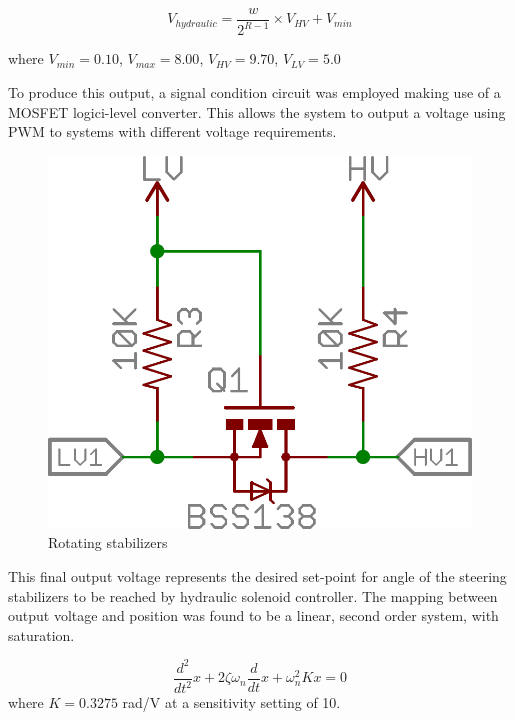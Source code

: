 \documentclass[authoryear]{elsarticle}
\begin{document}
\begin{equation}
  V_{hydraulic} = \frac{w}{2^{R-1}} \times V_{HV} + V_{min}
  \label{eq:v_out}
\end{equation}
\begin{flushleft}
where $V_{min}=0.10$, $V_{max}=8.00$, $V_{HV}=9.70$, $V_{LV}=5.0$
\end{flushleft}

To produce this output, a signal condition circuit was employed making
use of a MOSFET logici-level converter. This allows the system to
output a voltage using PWM to systems with different voltage
requirements.

\begin{figure}
  \centering
  \includegraphics[scale=0.3,natwidth=610,natheight=642]{signal_conditioning.png}
  \caption{Rotating stabilizers}
  \label{fig:signal_conditioning}
\end{figure}

This final output voltage represents the desired set-point for angle
of the steering stabilizers to be reached by hydraulic solenoid
controller. The mapping between output voltage and position was found
to be a linear, second order system, with saturation.

\begin{equation}
  \frac{d^2}{dt^2}x + 2\zeta\omega_{n}\frac{d}{dt}x + \omega_{n}^2 Kx = 0 
  \label{eq:v_out}
\end{equation}
where $K=0.3275$ rad/V at a sensitivity setting of 10.
\end{document}
